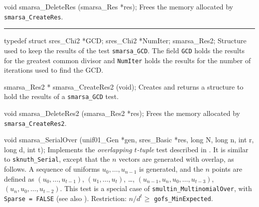 void smarsa_DeleteRes (smarsa_Res *res);
\endcode
 \tab 
  Frees the memory allocated by {\tt smarsa\_CreateRes}.
 \endtab

\bigskip\hrule\bigskip

\code

typedef struct {
   sres_Chi2 *GCD;
   sres_Chi2 *NumIter;
} smarsa_Res2;
\endcode
 \tab
  Structure used to keep the results of the test {\tt smarsa\_GCD}.
  The field {\tt GCD} holds the results for the greatest common divisor and 
  {\tt NumIter} holds the results for the number of iterations used to
  find the GCD.
 \endtab
\code


smarsa_Res2 * smarsa_CreateRes2 (void);
\endcode
 \tab 
  Creates and returns a structure to hold the results of a
 {\tt smarsa\_GCD} test. 
 \endtab
\code


void smarsa_DeleteRes2 (smarsa_Res2 *res);
\endcode
 \tab 
  Frees the memory allocated by {\tt smarsa\_CreateRes2}.
 \endtab

\fi  %


\code


void smarsa_SerialOver (unif01_Gen *gen, sres_Basic *res,
                        long N, long n, int r, long d, int t);
\endcode
 \tab
  Implements the {\em overlapping $t$-tuple\/}
  test described in
  \cite {rALT88a,rMAR85a}.  
  It is similar to {\tt sknuth\_Serial}, except that the $n$ vectors 
  are generated with overlap, as follows.
  A sequence of uniforms $u_0,\dots,u_{n-1}$ is generated, and the 
  $n$ points are defined as $(u_0,\dots,u_{t-1})$, $(u_1,\dots,u_t)$,
   \dots, $(u_{n-1},u_n,u_0,\dots,u_{t-3})$, $(u_n,u_0,\dots,u_{t-2})$. 
\iffalse %
 This function generates $n$ points in
  the unit hypercube in $t$ dimensions, using $t$ successive values
  returned by the  generator, which will make the
   components of a vector in $t$ dimensions, the $i$-th generated
  value being the first component of the $i$-th vector.
  It generates only $n$ values which form a 
  circular sequence: for $i > n-t+1$, the last $i-n+t-1$  components
  of vector $i$ are the first $i-n+t-1$ values.
  Then it divides the interval $[0,1)$ in $d$ equal segments; this gives
  a partition of the hypercube $[0,1)^t$ in $k = d^{t}$ cells.
\fi  %
  This test is a special case of {\tt smultin\_Multino\-mial\-Over},
  with {\tt Sparse = FALSE} (see also \cite{rLEC02c}).
  Restriction: $n/d^{t} \ge$ {\tt gofs\_MinExpected}.
 \endtab
\code


